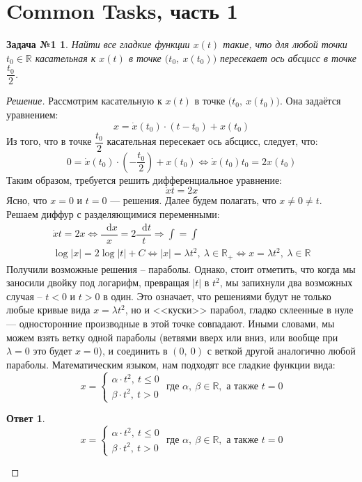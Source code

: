 \documentclass[a4paper,12pt]{article}
\newtheorem*{task1}{Задача №1}
\newtheorem*{ans}{Ответ}
\newcommand{\R}{\mathbb{R}}
\renewcommand*\d{\mathop{}\!\mathrm{d}}
\newcommand{\dx}{\dot{x}}
\newcommand{\bto}{\Longrightarrow}
\newcommand{\ds}{\displaystyle}
\begin{document}
\newpage
\section{Common Tasks, часть 1}

\begin{task1}
	Найти все гладкие функции $x(t)$ такие, что для любой точки $t_0 \in \R$ касательная к $x(t)$ в точке $\big(t_0,\ x(t_0)\big)$ пересекает ось абсцисс в точке $\dfrac{t_0}{2}$.
\end{task1}
\begin{proof}[Решение]
	Рассмотрим касательную к $x(t)$ в точке $\big(t_0,\ x(t_0)\big)$. Она задаётся уравнением:
	\[x = \dx(t_0) \cdot (t - t_0) + x(t_0)\]
	Из того, что в точке $\dfrac{t_0}{2}$ касательная пересекает ось абсцисс, следует, что:
	\[0 = \dx(t_0) \cdot \left(-\dfrac{t_0}{2}\right) + x(t_0) \iff \dx(t_0) t_0 = 2x(t_0)\]
	Таким образом, требуется решить дифференциальное уравнение:
	\[\dx t = 2x\]
	Ясно, что $x = 0$ и $t = 0$ --- решения. Далее будем полагать, что $x \neq 0 \neq t$. Решаем диффур с разделяющимися переменными:
	\begin{gather*}
	\dx t = 2x \iff \dfrac{\d x}{x} = 2\dfrac{\d t}{t} \bto \ds\int = \int\\
	\log|x| = 2\log|t| + C \iff |x| = \lambda t^2,\ \lambda \in \R_+ \iff x = \lambda t^2,\ \lambda \in \R
	\end{gather*}
	Получили возможные решения -- параболы. Однако, стоит отметить, что когда мы заносили двойку под логарифм, превращая $|t|$ в $t^2$, мы запихнули два возможных случая -- $t < 0$ и $t > 0$ в один. Это означает, что решениями будут не только любые кривые вида $x = \lambda t^2$, но и <<куски>> парабол, гладко склеенные в нуле --- односторонние производные в этой точке совпадают. Иными словами, мы можем взять ветку одной параболы (ветвями вверх или вниз, или вообще при $\lambda = 0$ это будет $x = 0$), и соединить в $(0,\ 0)$ с веткой другой аналогично любой параболы. Математическим языком, нам подходят все гладкие функции вида:
	\[x = \begin{cases}
	\alpha \cdot t^2,\ t \leqslant 0\\
	\beta \cdot t^2,\ t > 0
	\end{cases}\text{ где }\alpha,\ \beta \in \R,\text{ а также } t = 0\]
	
	\begin{ans}
		\[x = \begin{cases}
		\alpha \cdot t^2,\ t \leqslant 0\\
		\beta \cdot t^2,\ t > 0
		\end{cases}\text{ где }\alpha,\ \beta \in \R,\text{ а также } t = 0\]
	\end{ans}
\end{proof}
\end{document}

